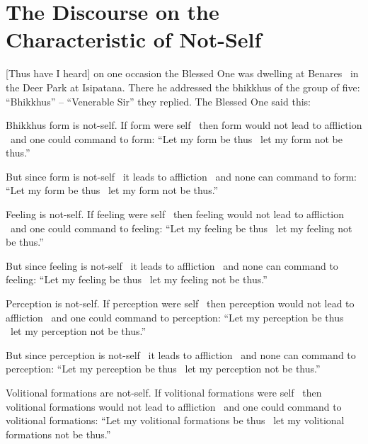\section{The Discourse on the Characteristic of Not-Self}
\label{characteristic-of-not-self}

[Thus have I heard] on one occasion the Blessed One was dwelling at Benares \breathmark\ in the Deer Park at Isipatana. There he addressed the bhikkhus of the group of five: ``Bhikkhus'' – ``Venerable Sir'' they replied. The Blessed One said this:

Bhikkhus form is not-self. If form were self \breathmark\ then form would not lead to affliction \breathmark\ and one could command to form: ``Let my form be thus \breathmark\ let my form not be thus.''

But since form is not-self \breathmark\ it leads to affliction \breathmark\ and none can command to form: ``Let my form be thus \breathmark\ let my form not be thus.''

Feeling is not-self. If feeling were self \breathmark\ then feeling would not lead to affliction \breathmark\ and one could command to feeling: ``Let my feeling be thus \breathmark\ let my feeling not be thus.''

But since feeling is not-self \breathmark\ it leads to affliction \breathmark\ and none can command to feeling: ``Let my feeling be thus \breathmark\ let my feeling not be thus.''

Perception is not-self. If perception were self \breathmark\ then perception would not lead to affliction \breathmark\ and one could command to perception: ``Let my perception be thus \breathmark\ let my perception not be thus.''

But since perception is not-self \breathmark\ it leads to affliction \breathmark\ and none can command to perception: ``Let my perception be thus \breathmark\ let my perception not be thus.''

Volitional formations are not-self. If volitional formations were self \breathmark\ then volitional formations would not lead to affliction \breathmark\ and one could command to volitional formations: ``Let my volitional formations be thus \breathmark\ let my volitional formations not be thus.''

